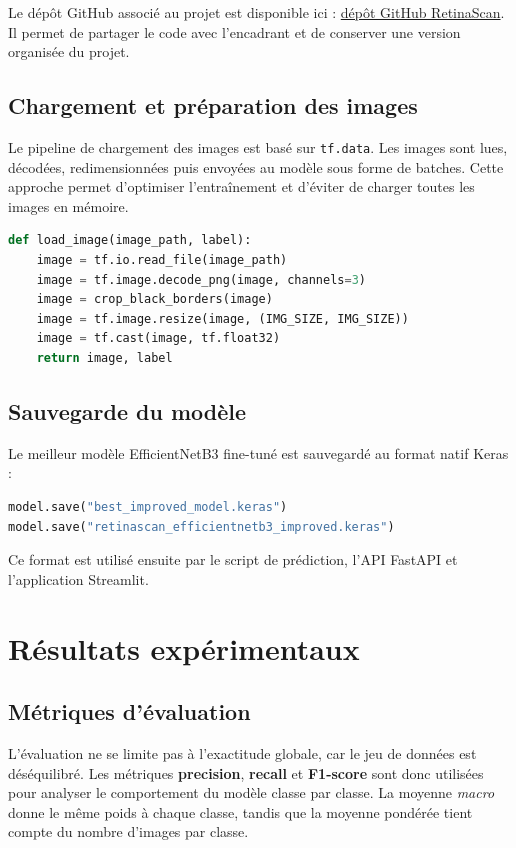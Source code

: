 \documentclass[12pt,a4paper]{report}
\begin{document}
Le dépôt GitHub associé au projet est disponible ici : \href{https://github.com/bilal-erraki/RetinaScan}{dépôt GitHub RetinaScan}. Il permet de partager le code avec l'encadrant et de conserver une version organisée du projet.

\section{Chargement et préparation des images}
Le pipeline de chargement des images est basé sur \texttt{tf.data}. Les images sont lues, décodées, redimensionnées puis envoyées au modèle sous forme de batches. Cette approche permet d'optimiser l'entraînement et d'éviter de charger toutes les images en mémoire.

\begin{lstlisting}[language=Python, caption={Fonction de chargement d'une image}]
def load_image(image_path, label):
    image = tf.io.read_file(image_path)
    image = tf.image.decode_png(image, channels=3)
    image = crop_black_borders(image)
    image = tf.image.resize(image, (IMG_SIZE, IMG_SIZE))
    image = tf.cast(image, tf.float32)
    return image, label
\end{lstlisting}

\section{Sauvegarde du modèle}
Le meilleur modèle EfficientNetB3 fine-tuné est sauvegardé au format natif Keras :

\begin{lstlisting}[language=Python]
model.save("best_improved_model.keras")
model.save("retinascan_efficientnetb3_improved.keras")
\end{lstlisting}

Ce format est utilisé ensuite par le script de prédiction, l'API FastAPI et l'application Streamlit.

\chapter{Résultats expérimentaux}

\section{Métriques d'évaluation}
L'évaluation ne se limite pas à l'exactitude globale, car le jeu de données est déséquilibré. Les métriques \textbf{precision}, \textbf{recall} et \textbf{F1-score} sont donc utilisées pour analyser le comportement du modèle classe par classe. La moyenne \textit{macro} donne le même poids à chaque classe, tandis que la moyenne pondérée tient compte du nombre d'images par classe.
\end{document}
